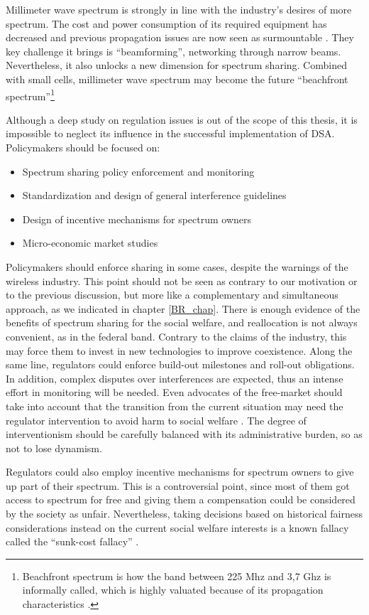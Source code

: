 Millimeter wave spectrum is strongly in line with the industry's desires of more spectrum. The cost and power consumption of its required equipment has decreased and previous propagation issues are now seen as surmountable \cite{Andrews2014}. They key challenge it brings is \enquote{beamforming}, networking through narrow beams. Nevertheless, it also unlocks a new dimension for spectrum sharing. Combined with small cells, millimeter wave spectrum may become the future \enquote{beachfront spectrum}\footnote{Beachfront spectrum is how the band between 225 Mhz and 3,7 Ghz is informally called, which is highly valuated because of its propagation characteristics \cite{AdvisorsonScience}.}

Although a deep study on regulation issues is out of the scope of this thesis, it is impossible to neglect its influence in the successful implementation of DSA. Policymakers should be focused on: 
\begin{itemize}
\item Spectrum sharing policy enforcement and monitoring
\item Standardization and design of general interference guidelines
\item Design of incentive mechanisms for spectrum owners
\item Micro-economic market studies 
\end{itemize} 

Policymakers should enforce sharing in some cases, despite the warnings of the wireless industry. This point should not be seen as contrary to our motivation or to the previous discussion, but more like a complementary and simultaneous approach, as we indicated in chapter \ref{BR_chap}. There is enough evidence of the benefits of  spectrum sharing for the social welfare, and reallocation is not always convenient, as in the federal band. Contrary to the claims of the industry, this may force them to invest in new technologies to improve coexistence. Along the same line, regulators could enforce build-out milestones and roll-out obligations. In addition, complex disputes over interferences are expected, thus an intense effort in monitoring will be needed. Even advocates of the free-market should take into account that the transition from the current situation may need the regulator intervention to avoid harm to social welfare \cite{Yoon2012}. The degree of interventionism should be carefully balanced with its administrative burden, so as not to lose dynamism. 

Regulators could also employ incentive mechanisms for spectrum owners to give up part of their spectrum. This is a controversial point, since most of them got access to spectrum for free and giving them a compensation could be considered by the society as unfair. Nevertheless, taking decisions based on historical fairness considerations instead on the current social welfare interests is a known fallacy called the \enquote{sunk-cost fallacy} \cite[p. 111]{Nuechterlein2013}. 

